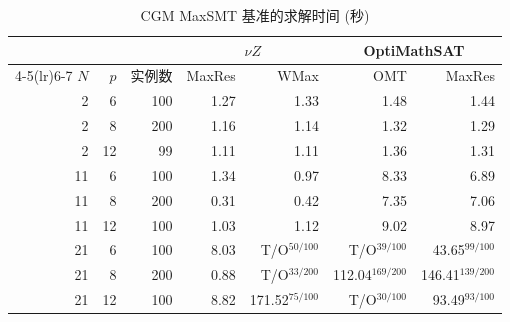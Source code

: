 \begin{table}[!htbp]
\centering
\caption{CGM MaxSMT 基准的求解时间 (秒)}
\label{tab:exp-maxsmt}
\small
\setlength{\tabcolsep}{3pt}
\begin{tabular}{@{}rrr rrrr@{}}
\toprule
& & & \multicolumn{2}{c}{$\nu Z$} & \multicolumn{2}{c}{OptiMathSAT} \\
\cmidrule(lr){4-5}\cmidrule(lr){6-7}
$N$ & $p$ & 实例数 & MaxRes & WMax & OMT & MaxRes \\
\midrule
2 & 6 & 100 & 1.27 & 1.33 & 1.48 & 1.44 \\
2 & 8 & 200 & 1.16 & 1.14 & 1.32 & 1.29 \\
2 & 12 & 99 & 1.11 & 1.11 & 1.36 & 1.31 \\
\midrule
11 & 6 & 100 & 1.34 & 0.97 & 8.33 & 6.89 \\
11 & 8 & 200 & 0.31 & 0.42 & 7.35 & 7.06 \\
11 & 12 & 100 & 1.03 & 1.12 & 9.02 & 8.97 \\
\midrule
21 & 6 & 100 & 8.03 & T/O$^{50/100}$ & T/O$^{39/100}$ & 43.65$^{99/100}$ \\
21 & 8 & 200 & 0.88 & T/O$^{33/200}$ & 112.04$^{169/200}$ & 146.41$^{139/200}$ \\
21 & 12 & 100 & 8.82 & 171.52$^{75/100}$ & T/O$^{30/100}$ & 93.49$^{93/100}$ \\
\bottomrule
\end{tabular}
\end{table}
